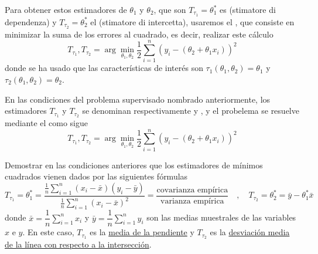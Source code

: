 \noindent
Para obtener estos estimadores de $\theta_1$ y $\theta_2$, que son $T_{\tau_1}=\theta_1^*$ es  (stimatore di dependenza) y $T_{\tau_2}=\theta_2^*$ el  (stimatore di intercetta), usaremos el , que consiste en minimizar la suma de los errores al cuadrado, es decir, realizar este cálculo
\begin{equation*}
    T_{\tau_1}, T_{\tau_2} = \arg \min_{\theta_1, \theta_2} \dfrac{1}{2}\sum\limits_{i=1}^{n} (y_i - (\theta_2 + \theta_1 x_i))^2
\end{equation*}
donde se ha usado que las características de interés son $\tau_1(\theta_1, \theta_2) = \theta_1$ y $\tau_2(\theta_1, \theta_2) = \theta_2$. \\
\begin{definicion}
    En las condiciones del problema supervisado nombrado anteriormente, los estimadores $T_{\tau_1}$ y $T_{\tau_2}$ se denominan respectivamente  y , y el probelema se resuelve mediante el  como sigue 
    \begin{equation*}
        T_{\tau_1}, T_{\tau_2} = \arg \min_{\theta_1, \theta_2}\dfrac{1}{2} \sum\limits_{i=1}^{n} (y_i - (\theta_2 + \theta_1 x_i))^2
    \end{equation*}
\end{definicion}
\begin{ejercicio}
    Demostrar en las condiciones anteriores que los estimadores de mínimos cuadrados vienen dados por las siguientes fórmulas
    \begin{equation*}
        T_{\tau_1} = \theta_1^* = \dfrac{\frac{1}{n} \sum\limits_{i=1}^{n} (x_i-\bar{x})(y_i-\bar{y})}{\frac{1}{n} \sum\limits_{i=1}^{n}(x_i-\bar{x})^2}=\dfrac{\text{covarianza empírica}}{\text{varianza empírica}} \quad , \quad T_{\tau_2} = \theta_2^* = \bar{y} - \theta_1^* \bar{x}
    \end{equation*}
    donde $\bar{x} = \dfrac{1}{n} \sum\limits_{i=1}^{n} x_i$ y $\bar{y} = \dfrac{1}{n} \sum\limits_{i=1}^{n} y_i$ son las medias muestrales de las variables $x$ e $y$. En este caso, $T_{\tau_1}$ es la \underline{media de la pendiente} y $T_{\tau_2}$ es la \underline{desviación media de la línea con respecto a la intersección}. \\
\end{ejercicio}


